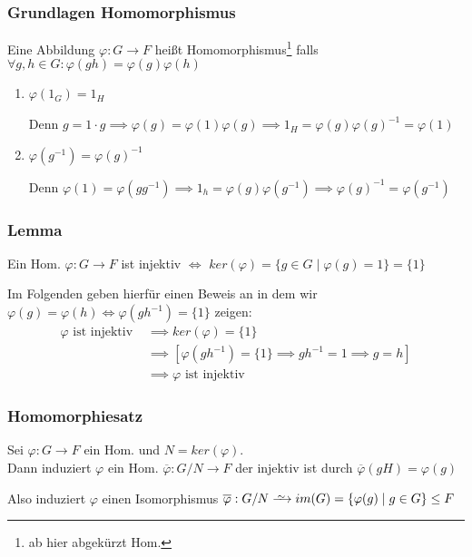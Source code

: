 \documentclass[12pt, german]{article}
\newcommand\iso{\xrightarrow{
		\,\smash{\raisebox{-0.65ex}{\ensuremath{\scriptstyle\sim}}}\,}}
\begin{document}
	\subsubsection{Grundlagen Homomorphismus}
	Eine Abbildung $\varphi: G \to F$ heißt Homomorphismus\footnote{ab hier abgekürzt Hom.} falls $\forall g,h \in G : \varphi(gh) = \varphi(g)\varphi(h)$ \\
	\begin{enumerate}[label=\roman*)]
		\item $\varphi(1_G) = 1_H$ ~\par
		Denn $g=1\cdot g \implies \varphi(g)=\varphi(1)\varphi(g) \implies 1_H = \varphi(g) \varphi(g)^{-1} = \varphi(1)$
		
		\item $\varphi(g^{-1})=\varphi(g)^{-1}$ ~\par
		Denn $\varphi(1)=\varphi(gg^{-1}) \implies 1_h = \varphi(g)\varphi(g^{-1}) \implies \varphi(g)^{-1} = \varphi(g^{-1})$
	\end{enumerate}
	
	\subsubsection{Lemma}
	Ein Hom. $\varphi: G \to F$ ist injektiv $\iff$ $ker(\varphi) = \{g \in G \mid \varphi(g)= 1\} = \{1\}$ 
	
	Im Folgenden geben hierfür einen Beweis an in dem wir $\varphi(g) = \varphi(h) \iff \varphi(gh^{-1}) = \{1\} $ zeigen:
	\begin{align*}
		\varphi \text{ ist injektiv } &\implies ker(\varphi) = \{1\} \\
		&\implies [\varphi(gh^{-1}) = \{1\} \implies gh^{-1} = 1 \implies g = h] \\ 
		&\implies \varphi \text{ ist injektiv}
	\end{align*}
	
	\subsubsection{Homomorphiesatz}
	Sei $\varphi: G \to F$ ein Hom.  und $N = ker(\varphi)$. \\
	Dann induziert $\varphi$ ein Hom. $\overline{\varphi} : G/N \to F$ der injektiv ist durch $\overline{\varphi}(gH) = \varphi(g)$ 
	\newline
	
	Also induziert $\varphi$ einen Isomorphismus $\overline{\varphi}: G/N \iso im(G) = \{\varphi(g) \mid g \in G\} \leq F$
	
\end{document}
